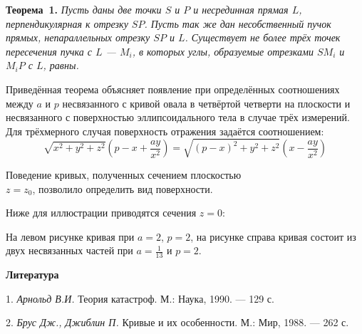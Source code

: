 \textbf{Теорема~1.} {\it Пусть даны две точки $S$ и $P$ и несрединная прямая $L$, перпендикулярная к отрезку $SP$. Пусть так же дан несобственный пучок прямых, непараллельных отрезку $SP$ и $L$. Существует не более трёх точек пересечения пучка с $L$ --- $M_i$, в которых углы, образуемые отрезками $SM_i$ и $M_iP$ с $L$, равны.}

Приведённая теорема объясняет появление при определённых соотношениях между $a$ и $p$ несвязанного с кривой овала в четвёртой четверти на плоскости и несвязанного с поверхностью эллипсоидального тела в случае трёх измерений. Для трёхмерного случая поверхность отражения задаётся соотношением:
\[
\sqrt{x^2+y^2+z^2}
\left( p-x+ \frac{ay}{x^2} \right)
=
\sqrt{{(p-x)}^2+y^2+z^2}
\left( x - \frac{ay}{x^2} \right)
\]

Поведение кривых, полученных сечением плоскостью \\
$z=z_0$, позволило определить вид поверхности.

Ниже для иллюстрации приводятся сечения $z=0$:

\begin{figure}[h]
\begin{minipage}[h]{0.49\linewidth}
\end{minipage}
\hfill
\begin{minipage}[h]{0.49\linewidth}
\end{minipage}
\label{ris:image1}
\end{figure}

На левом рисунке кривая при $a=2$, $p=2$, на рисунке справа кривая состоит из двух несвязанных частей  при $a=\frac{1}{13}$ и $p=2$.

\smallskip \centerline{\bf Литература}\nopagebreak

1. {\it Арнольд В.И.} Теория катастроф. М.: Наука, 1990. — 129 с.

2. {\it Брус Дж., Джиблин П.} Кривые и их особенности. М.: Мир, 1988. — 262 с.
